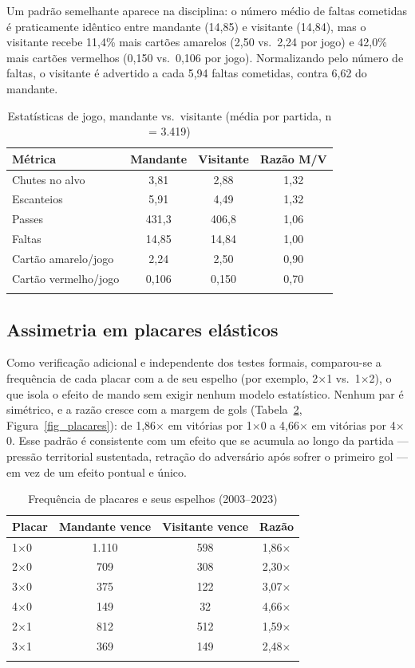 \documentclass[pdflatex,sn-mathphys-num]{sn-jnl}%
\theoremstyle{thmstyleone}%
\theoremstyle{thmstyletwo}%
\theoremstyle{thmstylethree}%
\begin{document}
Um padrão semelhante aparece na disciplina: o número médio de faltas cometidas é praticamente idêntico entre mandante (14,85) e visitante (14,84), mas o visitante recebe 11,4\% mais cartões amarelos (2,50 vs.\ 2,24 por jogo) e 42,0\% mais cartões vermelhos (0,150 vs.\ 0,106 por jogo). Normalizando pelo número de faltas, o visitante é advertido a cada 5,94 faltas cometidas, contra 6,62 do mandante.

\begin{table}[h]
\caption{Estatísticas de jogo, mandante vs.\ visitante (média por partida, n = 3.419)}\label{tab_stats}
\begin{tabular}{@{}lccc@{}}
\toprule
Métrica & Mandante & Visitante & Razão M/V\\
\midrule
Chutes no alvo        & 3,81  & 2,88  & 1,32\\
Escanteios            & 5,91  & 4,49  & 1,32\\
Passes                & 431,3 & 406,8 & 1,06\\
Faltas                & 14,85 & 14,84 & 1,00\\
Cartão amarelo/jogo   & 2,24  & 2,50  & 0,90\\
Cartão vermelho/jogo  & 0,106 & 0,150 & 0,70\\
\botrule
\end{tabular}
\end{table}

\subsection{Assimetria em placares elásticos}\label{subsec_placares}

Como verificação adicional e independente dos testes formais, comparou-se a frequência de cada placar com a de seu espelho (por exemplo, 2$\times$1 vs.\ 1$\times$2), o que isola o efeito de mando sem exigir nenhum modelo estatístico. Nenhum par é simétrico, e a razão cresce com a margem de gols (Tabela~\ref{tab_placares}, Figura~\ref{fig_placares}): de 1,86$\times$ em vitórias por 1$\times$0 a 4,66$\times$ em vitórias por 4$\times$0. Esse padrão é consistente com um efeito que se acumula ao longo da partida --- pressão territorial sustentada, retração do adversário após sofrer o primeiro gol --- em vez de um efeito pontual e único.

\begin{table}[h]
\caption{Frequência de placares e seus espelhos (2003--2023)}\label{tab_placares}
\begin{tabular}{@{}lccc@{}}
\toprule
Placar & Mandante vence & Visitante vence & Razão\\
\midrule
1$\times$0 & 1.110 & 598 & 1,86$\times$\\
2$\times$0 & 709   & 308 & 2,30$\times$\\
3$\times$0 & 375   & 122 & 3,07$\times$\\
4$\times$0 & 149   & 32  & 4,66$\times$\\
2$\times$1 & 812   & 512 & 1,59$\times$\\
3$\times$1 & 369   & 149 & 2,48$\times$\\
\botrule
\end{tabular}
\end{table}
\end{document}
